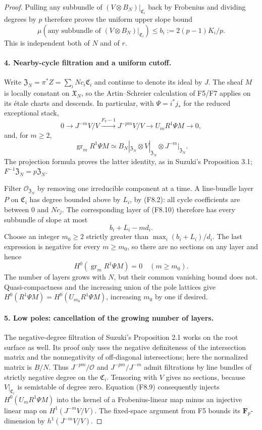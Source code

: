 \begin{proof}
Pulling any subbundle of $(V\otimes B_N)|_{\mathfrak C_i}$ back by
Frobenius and dividing degrees by $p$ therefore proves the uniform
upper slope bound
\[
 \mu(\text{any subbundle of }(V\otimes B_N)|_{\mathfrak C_i})
       \leq b_i:=2(p-1)K_i/p.
 \tag{F8.8}
\]
This is independent both of $N$ and of $r$.

\paragraph{4. Nearby-cycle filtration and a uniform cutoff.}
Write $\mathfrak Z_N=\pi^*Z=\sum_iNc_i\mathfrak C_i$ and continue
to denote its ideal by $J$. The sheaf $M$ is locally constant on
$\mathfrak X_N$, so the Artin--Schreier calculation of F5/F7 applies
on its \'etale charts and descends. In particular, with
$\Psi=i^*j_*$ for the reduced exceptional stack,
\[
 0\to J^{-m}V/V\xrightarrow{F_V-1}J^{-pm}V/V
       \to U_mR^1\Psi M\to0,
 \tag{F8.9}
\]
and, for $m\geq2$,
\[
 \operatorname{gr}_mR^1\Psi M
  \simeq B_N|_{\mathfrak Z_N}\otimes V|_{\mathfrak Z_N}
                          \otimes J^{-m}|_{\mathfrak Z_N}.
 \tag{F8.10}
\]
The projection formula proves the latter identity, as in Suzuki's
Proposition 3.1; $F^{-1}\mathfrak Z_N=p\mathfrak Z_N$.

Filter $\mathcal O_{\mathfrak Z_N}$ by removing one irreducible
component at a time. A line-bundle layer $P$ on $\mathfrak C_i$
has degree bounded above by $L_i$, by (F8.2): all cycle coefficients
are between $0$ and $Nc_j$. The corresponding layer of (F8.10)
therefore has every subbundle of slope at most
\[
 b_i+L_i-md_i.
\]
Choose an integer $m_0\geq2$ strictly greater than
$\max_i(b_i+L_i)/d_i$. The last expression is negative for every
$m\geq m_0$, so there are no sections on any layer and hence
\[
 H^0(\operatorname{gr}_mR^1\Psi M)=0\quad(m\geq m_0).
 \tag{F8.11}
\]
The number of layers grows with $N$, but their common vanishing
bound does not. Quasi-compactness and the increasing union of the
pole lattices give
$H^0(R^1\Psi M)=H^0(U_{m_0}R^1\Psi M)$, increasing $m_0$ by one
if desired.

\paragraph{5. Low poles: cancellation of the growing number of layers.}
The negative-degree filtration of Suzuki's Proposition 2.1 works
on the root surface as well. Its proof only uses the negative
definiteness of the intersection matrix and the nonnegativity of
off-diagonal intersections; here the normalized matrix is $B/N$.
Thus $J^{-pm}/\mathcal O$ and $J^{-pm}/J^{-m}$ admit filtrations
by line bundles of strictly negative degree on the $\mathfrak C_i$.
Tensoring with $V$ gives no sections, because $V|_{\mathfrak C_i}$
is semistable of degree zero. Equation (F8.9) consequently injects
$H^0(U_mR^1\Psi M)$ into the kernel of a Frobenius-linear map minus
an injective linear map on
$H^1(J^{-m}V/V)$. The fixed-space argument from F5 bounds its
$\mathbf F_p$-dimension by $h^1(J^{-m}V/V)$.


\end{proof}
